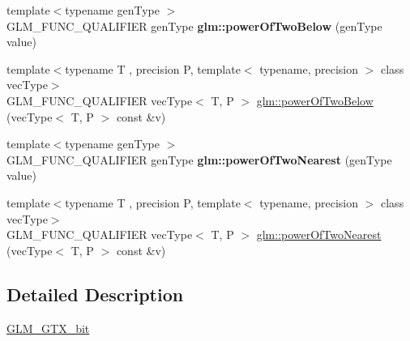 \begin{DoxyCompactItemize}
\item 
\mbox{\label{bit_8inl_a895c5bb540f5f52ef2b7a81321a98627}} 
{\footnotesize template$<$typename gen\+Type $>$ }\\G\+L\+M\+\_\+\+F\+U\+N\+C\+\_\+\+Q\+U\+A\+L\+I\+F\+I\+ER gen\+Type {\bfseries glm\+::power\+Of\+Two\+Below} (gen\+Type value)
\item 
{\footnotesize template$<$typename T , precision P, template$<$ typename, precision $>$ class vec\+Type$>$ }\\G\+L\+M\+\_\+\+F\+U\+N\+C\+\_\+\+Q\+U\+A\+L\+I\+F\+I\+ER vec\+Type$<$ T, P $>$ \hyperlink{group__gtx__bit_gae33bb1ca2b55846b23a0f0796a679195}{glm\+::power\+Of\+Two\+Below} (vec\+Type$<$ T, P $>$ const \&v)
\item 
\mbox{\label{bit_8inl_a90d716367872062cffce4a8cd51acd0c}} 
{\footnotesize template$<$typename gen\+Type $>$ }\\G\+L\+M\+\_\+\+F\+U\+N\+C\+\_\+\+Q\+U\+A\+L\+I\+F\+I\+ER gen\+Type {\bfseries glm\+::power\+Of\+Two\+Nearest} (gen\+Type value)
\item 
{\footnotesize template$<$typename T , precision P, template$<$ typename, precision $>$ class vec\+Type$>$ }\\G\+L\+M\+\_\+\+F\+U\+N\+C\+\_\+\+Q\+U\+A\+L\+I\+F\+I\+ER vec\+Type$<$ T, P $>$ \hyperlink{group__gtx__bit_ga2d7e85995d097518b8d70cd409bda39e}{glm\+::power\+Of\+Two\+Nearest} (vec\+Type$<$ T, P $>$ const \&v)
\end{DoxyCompactItemize}


\subsection{Detailed Description}
\hyperlink{group__gtx__bit}{G\+L\+M\+\_\+\+G\+T\+X\+\_\+bit} 